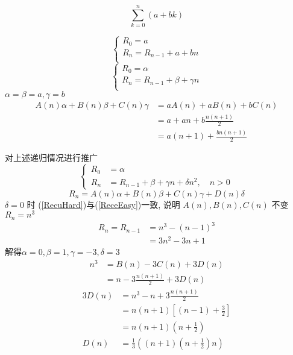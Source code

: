 \begin{example}
    \begin{equation*}
        \sum_{k=0}^{n}(a+b k)
    \end{equation*}
\end{example}
\begin{solve}
    \begin{equation*}
        \left\{
            \begin{array}{l}
                R_0 = a \\
                R_n = R_{n-1} + a+bn\\
            \end{array}
        \right.
    \end{equation*}
    \begin{equation*}
        \left\{
            \begin{array}{l}
                R_0 = \alpha \\
                R_n = R_{n-1} + \beta + \gamma n\\
            \end{array}
        \right.
    \end{equation*}
    $ \alpha = \beta =a, \gamma = b $ 
    \begin{align*}
        A(n)\alpha + B(n)\beta + C(n)\gamma 
        &= a A(n) + a B(n) + b C(n)\\
        &= a + a n + b \frac{n(n+1)}{2}\\
        &= a(n+1)+\frac{bn(n+1)}{2}
    \end{align*}
\end{solve}

对上述递归情况进行推广
\begin{equation}\label{RecuHard}
    \left\{
    \begin{aligned}
        R_0 &= \alpha \\
        R_n &= R_{n-1} + \beta + \gamma n + \delta n^2, \quad n>0
    \end{aligned}
    \right.
\end{equation}
\begin{equation}\label{RecuHardABC}
    R_n = A(n)\alpha + B(n)\beta + C(n)\gamma +D(n) \delta
\end{equation}
$ \delta=0 $ 时 (\ref{RecuHard})与(\ref{ReceEasy})一致, 说明
$ A(n), B(n), C(n) $ 不变\\
$ R_n = n^3 $ 
\begin{align*}
    R_n = R_{n-1} &= n^3 - (n-1)^3 \\
    &= 3n^2 - 3n + 1
\end{align*}
解得$ \alpha=0, \beta=1, \gamma=-3, \delta=3 $ 
\begin{align*}
    n^3 &= B(n)-3C(n)+3D(n)\\
    &= n-3 \frac{n(n+1)}{2}+3D(n)
\end{align*}
\begin{align*}
    3D(n) &= n^3 - n + 3 \frac{n(n+1)}{2} \\
    &= n(n+1) \left[(n-1)+\frac{3}{2}\right] \\
    &= n(n+1)(n+\frac{1}{2})\\
    D(n) &= \frac{1}{3}\left((n+1)(n+\frac{1}{2})n\right)
\end{align*}

